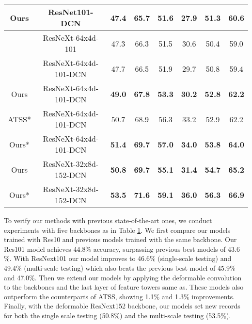\documentclass[runningheads]{llncs}
\begin{document}
\begin{table}[t]
\begin{center}
\begin{tabular}{c|c|ccc|ccc}
Ours & ResNet101-DCN & \textbf{47.4} & 65.7 & \textbf{51.6} & \textbf{27.9} & \textbf{51.3} & \textbf{60.6} \\
\hline
\begin{comment}
FreeAnchor\cite{freeanchor}*$\dagger$ & ResNeXt-64x4d-101 & 47.3 & 66.3 & 51.5 & 30.6 & 50.4 & 59.0 \\
\hline
\end{comment}
ATSS\cite{atss} & ResNeXt-64x4d-101-DCN & 47.7 & 66.5 & 51.9 & 29.7 & 50.8 & 59.4 \\
Ours & ResNeXt-64x4d-101-DCN & \textbf{49.0} & \textbf{67.8} & \textbf{53.3} & \textbf{30.2} & \textbf{52.8} & \textbf{62.2} \\
\hline
ATSS\cite{atss}* & ResNeXt-64x4d-101-DCN & 50.7 & 68.9 & 56.3 & 33.2 & 52.9 & 62.2 \\
Ours* & ResNeXt-64x4d-101-DCN & \textbf{51.4} & \textbf{69.7} & \textbf{57.0} & \textbf{34.0} & \textbf{53.8} & \textbf{64.0} \\
\hline
Ours & ResNeXt-32x8d-152-DCN & \textbf{50.8} & \textbf{69.7} & \textbf{55.1} & \textbf{31.4} & \textbf{54.7} & \textbf{65.2} \\
\hline
Ours* & ResNeXt-32x8d-152-DCN & \textbf{53.5} & \textbf{71.6} & \textbf{59.1} & \textbf{36.0} & \textbf{56.3} & \textbf{66.9} \\
\hline
\end{tabular}
\label{table:test}
\end{center}
\end{table}

To verify our methods with previous state-of-the-art ones, we conduct experiments with five backbones as in Table \ref{table:test}. We first compare our models trained with Res10 and previous models trained with the same backbone. Our Res101 model achieves 44.8\% accuracy, surpassing previous best models\cite{atss, mal} of 43.6 \%. With ResNext101 our model improves to 46.6\% (single-scale testing) and 49.4\% (multi-scale testing) which also beats the previous best model of 45.9\% and 47.0\%\cite{mal}. Then we extend our models by applying the deformable convolution to the backbones and the last layer of feature towers same as\cite{atss}. These models also outperform the counterparts of ATSS, showing 1.1\% and 1.3\% improvements. Finally, with the deformable ResNext152 backbone, our models set new records for both the single scale testing (50.8\%)  and the multi-scale testing (53.5\%).
\end{document}
